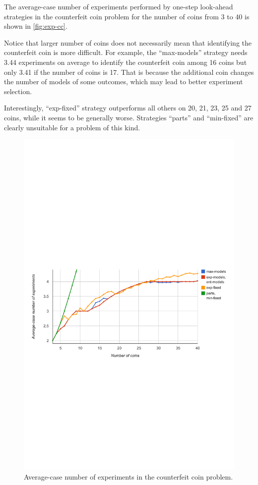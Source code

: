 The average-case number of experiments performed by one-step look-ahead
  strategies in the counterfeit coin problem
  for the number of coins from 3 to 40 is shown in \autoref{fig:exp-cc}.

Notice that larger number of coins does not necessarily mean that
  identifying the counterfeit coin is more difficult.
For example, the ``max-models'' strategy needs
  3.44 experiments on average to identify the counterfeit coin
  among 16 coins but only 3.41 if the number of coins is 17.
That is because the additional coin changes
  the number of models of some outcomes,
  which may lead to better experiment selection.

Interestingly, ``exp-fixed'' strategy outperforms all others
  on 20, 21, 23, 25 and 27 coins, while it seems to be
  generally worse.
Strategies ``parts'' and ``min-fixed'' are clearly unsuitable for
  a problem of this kind.

\begin{figure}[h]
\begin{center}
\includegraphics[width=\textwidth]{pictures/graph-cc.pdf}
\caption{Average-case number of experiments in the counterfeit coin problem.}
\label{fig:exp-cc}
\end{center}
\end{figure}

